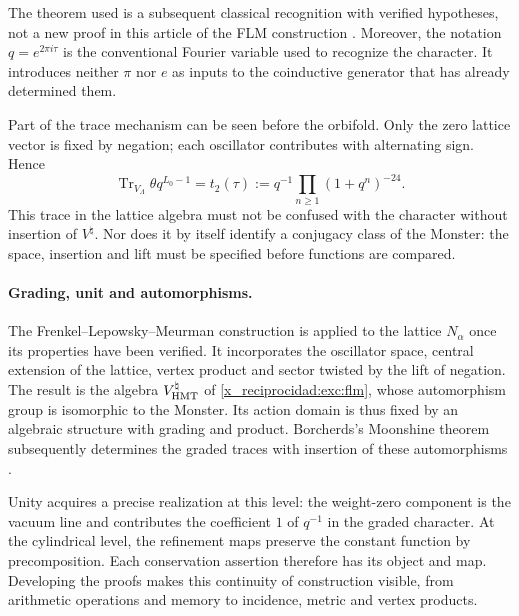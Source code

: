 The theorem used is a subsequent classical recognition with
verified hypotheses, not a new proof in this article of
the FLM construction \cite{x_reciprocidad:flm}.
Moreover, the notation $q=e^{2\pi i\tau}$ is the conventional Fourier
variable used to recognize the character. It introduces neither $\pi$
nor $e$ as inputs to the coinductive generator that has already determined them.

Part of the trace mechanism can be seen before the orbifold.
Only the zero lattice vector is fixed by negation; each
oscillator contributes with alternating sign. Hence
\[
 \operatorname{Tr}_{V_\Lambda}\theta q^{L_0-1}
   =t_2(\tau)
   :=q^{-1}\prod_{n\geq1}(1+q^n)^{-24}.
\]
This trace in the lattice algebra must not be confused with the
character without insertion of $V^\natural$. Nor does it by itself identify
a conjugacy class of the Monster: the space, insertion
and lift must be specified before functions are compared.


\paragraph{Grading, unit and automorphisms.}
\label{x_reciprocidad:inc-ampl-automorfismos}
The Frenkel--Lepowsky--Meurman construction is applied to the lattice
$N_\alpha$ once its properties have been verified. It incorporates the oscillator
space, central extension of the lattice, vertex product
and sector twisted by the lift of negation. The result is
the algebra $V^\natural_{\rm HMT}$ of \eqref{x_reciprocidad:exc:flm}, whose automorphism
group is isomorphic to the Monster. Its action domain is thus
fixed by an algebraic structure with grading and product. Borcherds's
Moonshine theorem subsequently determines the graded traces
with insertion of these automorphisms \cite{x_reciprocidad:flm,x_reciprocidad:borcherds}.

Unity acquires a precise realization at this level: the weight-zero
component is the vacuum line and contributes the coefficient $1$ of
$q^{-1}$ in the graded character. At the cylindrical level, the
refinement maps preserve the constant function by
precomposition. Each conservation assertion therefore has its
object and map. Developing the proofs makes this continuity of
construction visible, from arithmetic operations and
memory to incidence, metric and vertex products.

